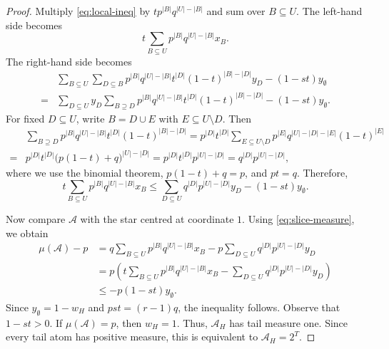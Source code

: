 \documentclass[10pt,a4paper]{amsart}
\begin{document}
\begin{proof}
Multiply \eqref{eq:local-ineq} by $t p^{|B|}q^{|U|-|B|}$ and sum over
$B\subseteq U$. The left-hand side becomes
$$
t\sum_{B\subseteq U}p^{|B|}q^{|U|-|B|}x_B.
$$
The right-hand side becomes
\begin{align*}
&\sum_{B\subseteq U}\sum_{D\subseteq B}
p^{|B|}q^{|U|-|B|}t^{|D|}(1-t)^{|B|-|D|}y_D-(1-st)y_\emptyset\\
=&\sum_{D\subseteq U}y_D
\sum_{B\supseteq D}
p^{|B|}q^{|U|-|B|}t^{|D|}(1-t)^{|B|-|D|}-(1-st)y_\emptyset.
\end{align*}
 For fixed $D\subseteq U$, write $B=D\cup E$ with $E\subseteq U\setminus D$. Then
\begin{align*}
 &\sum_{B\supseteq D}
p^{|B|}q^{|U|-|B|}t^{|D|}(1-t)^{|B|-|D|}
=
p^{|D|}t^{|D|}
\sum_{E\subseteq U\setminus D}
p^{|E|}q^{|U|-|D|-|E|}(1-t)^{|E|}\\
=&
p^{|D|}t^{|D|}
\bigl(p(1-t)+q\bigr)^{|U|-|D|}
=
p^{|D|}t^{|D|}
p^{|U|-|D|}
=
q^{|D|}p^{|U|-|D|},
\end{align*}
where we use the binomial theorem, $p(1-t)+q=p$, and $pt=q$.
Therefore, 
\begin{equation}\label{eq:weighted-local}
 t\sum_{B\subseteq U}p^{|B|}q^{|U|-|B|}x_B
 \le \sum_{D\subseteq U}q^{|D|}p^{|U|-|D|}y_D-(1-st)y_\emptyset.
\end{equation}

Now compare $\mathcal{A}$ with the star centred at coordinate $1$.  Using
\eqref{eq:slice-measure}, we obtain
\begin{align*}
 \mu(\mathcal{A})-p
 &=q\sum_{B\subseteq U}p^{|B|}q^{|U|-|B|}x_B
   -p\sum_{D\subseteq U}q^{|D|}p^{|U|-|D|}y_D \\
 &=p\left(
 t\sum_{B\subseteq U}p^{|B|}q^{|U|-|B|}x_B
 -\sum_{D\subseteq U}q^{|D|}p^{|U|-|D|}y_D\right) \\
 &\le -p(1-st)y_\emptyset.
\end{align*}
Since $y_\emptyset=1-w_H$ and $pst=(r-1)q$, the inequality follows.
Observe that $1-st>0$.
If $\mu(\mathcal{A})=p$, then $w_H=1$. Thus, $\mathcal{A}_H$ has tail measure one. Since every tail
atom has positive measure, this is equivalent to $\mathcal{A}_H=2^T$.
\end{proof}
\end{document}
